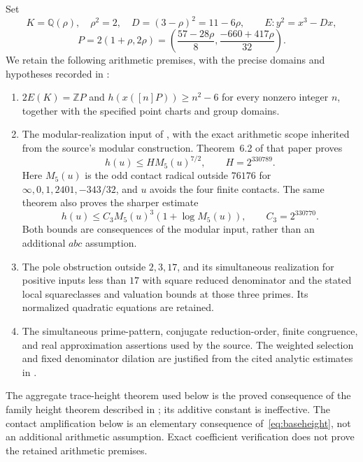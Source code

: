 \documentclass[11pt,a4paper]{article}
\newcommand{\Q}{\mathbb Q}\newcommand{\Z}{\mathbb Z}\newcommand{\HH}{\mathcal H}
\begin{document}
Set
\[
 K=\Q(\rho),\quad \rho^2=2,\quad D=(3-\rho)^2=11-6\rho,
 \qquad E:y^2=x^3-Dx,
\]
\[
 P=2(1+\rho,2\rho)
 =\left(\frac{57-28\rho}{8},\frac{-660+417\rho}{32}\right).
\]
We retain the following arithmetic premises, with the precise domains
and hypotheses recorded in \cite{Dependencies,Source,Weights}:
\begin{enumerate}
\item $2E(K)=\Z P$ and $h(x([n]P))\ge n^2-6$ for every nonzero
integer $n$, together with the specified point charts and group domains.
\item The modular-realization input of
\cite[Definition~6.1]{NewHeight}, with the exact arithmetic scope inherited
from the source's modular construction. Theorem~6.2 of that paper proves
\begin{equation}\label{eq:baseheight}
 h(u)\le H M_5(u)^{7/2},\qquad H=2^{330789}.
\end{equation}
Here $M_5(u)$ is the odd contact radical outside $76176$ for
$\infty,0,1,2401,-343/32$, and $u$ avoids the four finite contacts.
The same theorem also proves the sharper estimate
\begin{equation}\label{eq:baseheightsharp}
 h(u)\le C_3M_5(u)^3(1+\log M_5(u)),\qquad C_3=2^{330770}.
\end{equation}
Both bounds are consequences of the modular input, rather than an
additional $abc$ assumption.
\item The pole obstruction outside $2,3,17$, and its simultaneous
realization for positive inputs less than $17$ with square reduced
denominator and the stated local squareclasses and valuation bounds
at those three primes. Its normalized quadratic equations are retained.
\item The simultaneous prime-pattern, conjugate reduction-order,
finite congruence, and real approximation assertions used by the source.
The weighted selection and fixed denominator dilation are justified
from the cited analytic estimates in \cite{Selection}.
\end{enumerate}
The aggregate trace-height theorem used below is the proved consequence
of the family height theorem described in \cite{Aggregate}; its additive
constant is ineffective. The contact amplification below is an elementary consequence of~\eqref{eq:baseheight},
not an additional arithmetic assumption. Exact coefficient verification
does not prove the retained arithmetic premises.
\end{document}
